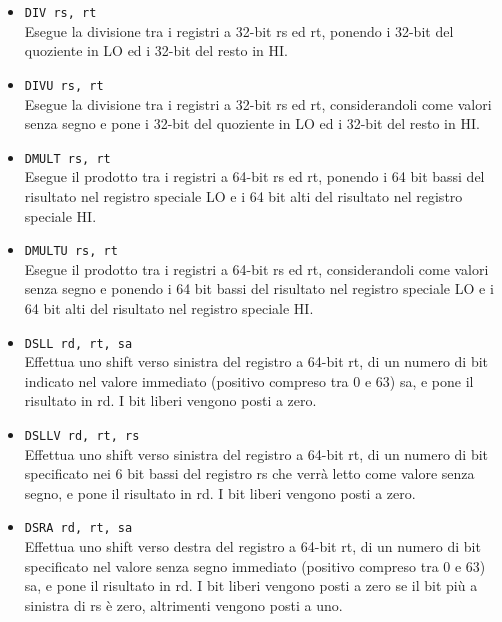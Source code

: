 \documentclass[12pt]{report}
\begin{document}
\begin{itemize}
	\item \texttt{DIV rs, rt}\\
	Esegue la divisione tra i registri a 32-bit rs ed rt, ponendo i 32-bit del quoziente
	in LO ed i 32-bit del resto in HI.

	\item \texttt{DIVU rs, rt}\\
    	Esegue la divisione tra i registri a 32-bit rs ed rt, considerandoli come valori senza segno e
    	pone i 32-bit del quoziente in LO ed i 32-bit del resto in HI.
	
	\item \texttt{DMULT rs, rt}\\
	Esegue il prodotto tra i registri a 64-bit rs ed rt, ponendo i 64 bit bassi del risultato nel registro speciale LO
	e i 64 bit alti del risultato nel registro speciale HI.

	\item \texttt{DMULTU rs, rt}\\
	Esegue il prodotto tra i registri a 64-bit rs ed rt, considerandoli come valori senza segno e ponendo i 64 bit bassi
	del risultato nel registro speciale LO e i 64 bit alti del risultato nel registro speciale HI.

	\item \texttt{DSLL rd, rt, sa}\\
	Effettua uno shift verso sinistra del registro a 64-bit rt, di un numero di bit indicato nel valore immediato (positivo compreso tra 0 e 63) sa, 
	e pone il risultato in rd. I bit liberi vengono posti a zero.

	\item \texttt{DSLLV rd, rt, rs}\\
	Effettua uno shift verso sinistra del registro a 64-bit rt, di un numero di bit specificato nei 6 bit bassi del registro 
    rs che verr\`{a} letto come valore senza segno, e pone il risultato in rd. I bit liberi vengono posti a zero.

	\item \texttt{DSRA rd, rt, sa}\\
	Effettua uno shift verso destra del registro a 64-bit rt, di un numero di bit specificato nel valore senza segno immediato (positivo compreso tra 0 e 63) sa, 
	e pone il risultato in rd. I bit liberi vengono posti a zero se il bit pi\`{u} a sinistra di rs \`{e} zero, altrimenti vengono posti a uno.


\end{itemize}
\end{document}
